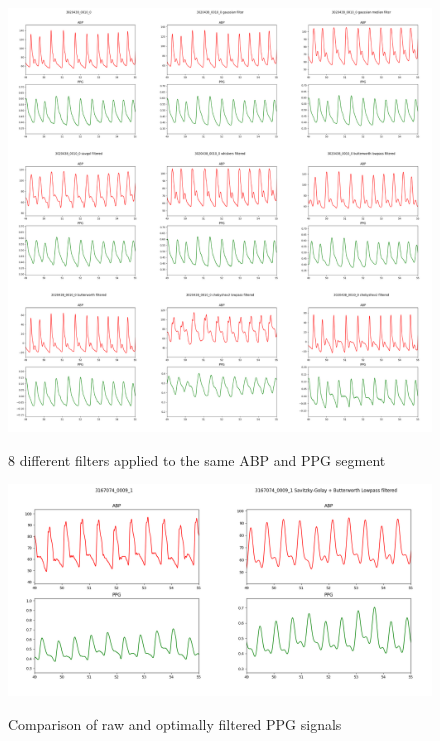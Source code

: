 \begin{figure}[!]
    \begin{minipage}{\textwidth}
        \vspace{-2cm}
        \hspace{-1.5cm}
        \includegraphics[width=1.2\textwidth]{images/methods/filters}
        \vspace{-1cm}
        \captionsetup{format=plain, justification=centering}
        \caption{\small{8 different filters applied to the same ABP and PPG segment}}
        \label{fig:filters}
        \vspace{0.5cm}
        \includegraphics[width=\textwidth]{images/methods/opt_filtering}
        \vspace{-1cm}
        \captionsetup{format=plain, justification=centering}
        \caption{\small{Comparison of raw and optimally filtered PPG signals}}
        \label{fig:opt_filtering}
    \end{minipage}
\end{figure}

